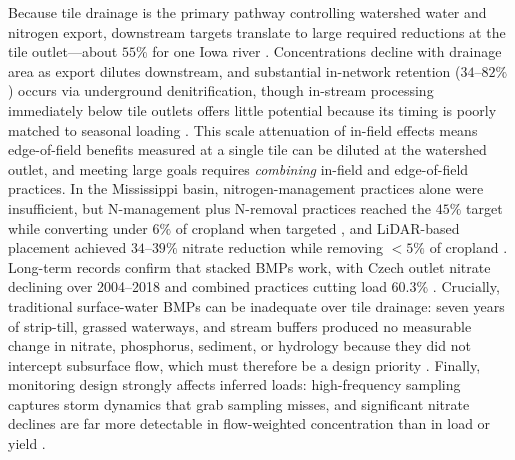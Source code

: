 Because tile drainage is the primary pathway controlling watershed water and
nitrogen export, downstream targets translate to large required reductions at
the tile outlet---about $55\%$ for one Iowa river
\parencite{Schilling2012b,Ikenberry2014}. Concentrations decline with drainage
area as export dilutes downstream, and substantial in-network retention
($34$--$82\%$) occurs via underground denitrification, though in-stream
processing immediately below tile outlets offers little potential because its
timing is poorly matched to seasonal loading
\parencite{Schilling2012b,Billy2011,Billy2013}. This scale attenuation of
in-field effects means edge-of-field benefits measured at a single tile can be
diluted at the watershed outlet, and meeting large goals requires
\emph{combining} in-field and edge-of-field practices. In the Mississippi
basin, nitrogen-management practices alone were insufficient, but N-management
plus N-removal practices reached the $45\%$ target while converting under
$6\%$ of cropland when targeted \parencite{McLellan2015}, and LiDAR-based
placement achieved $34$--$39\%$ nitrate reduction while removing $<5\%$ of
cropland \parencite{Tomer2015,Kvítek2023}. Long-term records confirm that
stacked BMPs work, with Czech outlet nitrate declining over 2004--2018 and
combined practices cutting load $60.3\%$
\parencite{Fraindová2022,Law2022}. Crucially, traditional surface-water BMPs
can be inadequate over tile drainage: seven years of strip-till, grassed
waterways, and stream buffers produced no measurable change in nitrate,
phosphorus, sediment, or hydrology because they did not intercept subsurface
flow, which must therefore be a design priority \parencite{Lemke2011}.
Finally, monitoring design strongly affects inferred loads: high-frequency
sampling captures storm dynamics that grab sampling misses, and significant
nitrate declines are far more detectable in flow-weighted concentration than
in load or yield \parencite{Drake2018,Danalatos2022,Irvine2019}.